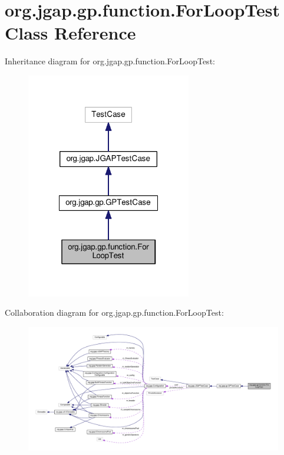 \hypertarget{classorg_1_1jgap_1_1gp_1_1function_1_1_for_loop_test}{\section{org.\-jgap.\-gp.\-function.\-For\-Loop\-Test Class Reference}
\label{classorg_1_1jgap_1_1gp_1_1function_1_1_for_loop_test}
}


Inheritance diagram for org.\-jgap.\-gp.\-function.\-For\-Loop\-Test\-:
\nopagebreak
\begin{figure}[H]
\begin{center}
\leavevmode
\includegraphics[width=204pt]{classorg_1_1jgap_1_1gp_1_1function_1_1_for_loop_test__inherit__graph}
\end{center}
\end{figure}


Collaboration diagram for org.\-jgap.\-gp.\-function.\-For\-Loop\-Test\-:
\nopagebreak
\begin{figure}[H]
\begin{center}
\leavevmode
\includegraphics[width=350pt]{classorg_1_1jgap_1_1gp_1_1function_1_1_for_loop_test__coll__graph}
\end{center}
\end{figure}
